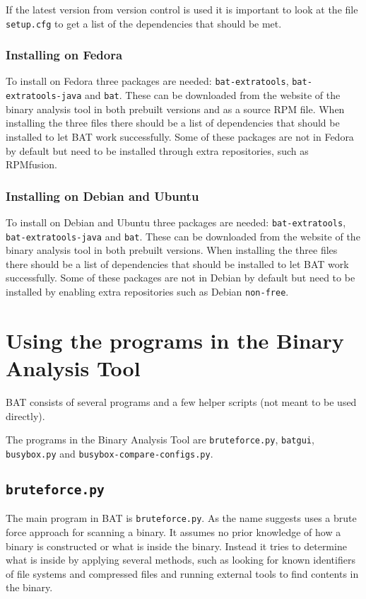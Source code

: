 \documentclass[10pt]{article}
\begin{document}
If the latest version from version control is used it is important to look at
the file \texttt{setup.cfg} to get a list of the dependencies that should be
met.

\subsubsection{Installing on Fedora}

To install on Fedora three packages are needed:
\texttt{bat-extratools}, \texttt{bat-extratools-java} and \texttt{bat}. These
can be downloaded from the website of the binary analysis tool in both prebuilt
versions and as a source RPM file. When installing the three files there should
be a list of dependencies that should be installed to let BAT work
successfully. Some of these packages are not in Fedora by default but need to
be installed through extra repositories, such as RPMfusion.

\subsubsection{Installing on Debian and Ubuntu}

To install on Debian and Ubuntu three packages are needed:
\texttt{bat-extratools}, \texttt{bat-extratools-java} and \texttt{bat}. These
can be downloaded from the website of the binary analysis tool in both prebuilt
versions. When installing the three files there should be a list of
dependencies that should be installed to let BAT work successfully. Some of
these packages are not in Debian by default but need to be installed by
enabling extra repositories such as Debian \texttt{non-free}.

\section{Using the programs in the Binary Analysis Tool}

BAT consists of several programs and a few helper scripts (not meant to be
used directly).

The programs in the Binary Analysis Tool are \texttt{bruteforce.py}, \texttt{batgui},
\texttt{busybox.py} and \texttt{busybox-compare-configs.py}.

\subsection{\texttt{bruteforce.py}}

The main program in BAT is \texttt{bruteforce.py}. As the name suggests uses a
brute force approach for scanning a binary. It assumes no prior knowledge of
how a binary is constructed or what is inside the binary. Instead it tries to
determine what is inside by applying several methods, such as looking for
known identifiers of file systems and compressed files and running external
tools to find contents in the binary.
\end{document}
